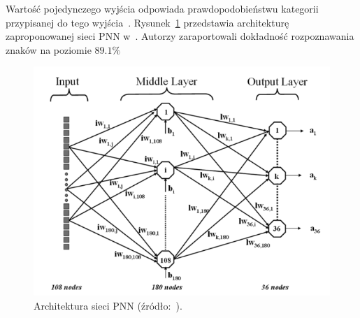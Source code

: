 Wartość pojedynczego wyjścia odpowiada prawdopodobieństwu kategorii przypisanej do tego wyjścia~\cite{Lexicon_on_Neural_networks}.
Rysunek~\ref{fig:pnn_architecture} przedstawia architekturę zaproponowanej sieci PNN w~\cite{1688109}.
Autorzy zaraportowali dokładność rozpoznawania znaków na poziomie $89.1\%$
\begin{figure}[!ht]
    \centering
    \includegraphics[scale=0.6]{Pictures/pnn_architecture}
    \caption{Architektura sieci PNN (źródło:~\cite{1688109}).}
    \label{fig:pnn_architecture}
\end{figure}
\FloatBarrier

